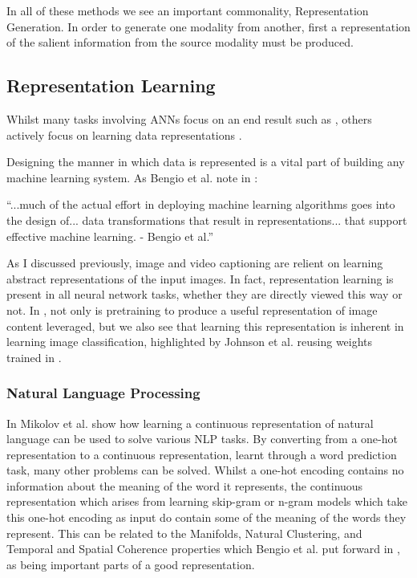 In all of these methods we see an important commonality, Representation Generation. In order to generate one modality from another, first a representation of the salient information from the source modality must be produced.

\subsection{Representation Learning}

Whilst many tasks involving \acp{ANN} focus on an end result such as \cite{krizhevsky2012imagenet}, others actively focus on learning data representations \cite{radford2015unsupervised, silberer2014learning, wavenet, vincent2010stacked, mikolov2013distributed, mikolov2013efficient, mikolov2013linguistic, feng2010visual, eslami2018neural, donahue2019large}.

Designing the manner in which data is represented is a vital part of building any machine learning system. As Bengio et al. note in \cite{repRev}:

\begin{displayquote}
``...much of the actual effort in deploying machine learning algorithms goes into the design of... data transformations that result in representations... that support effective machine learning. - Bengio et al.''
\end{displayquote}

As I discussed previously, image and video captioning are relient on learning abstract representations of the input images. In fact, representation learning is present in all neural network tasks, whether they are directly viewed this way or not. In \cite{vinyals2015show, venugopalan2014translating, johnson2016densecap}, not only is pretraining to produce a useful representation of image content leveraged, but we also see that learning this representation is inherent in learning image classification, highlighted by Johnson et al. \cite{johnson2016densecap} reusing weights trained in \cite{simonyan2014very}. 

\subsubsection{Natural Language Processing}
In \cite{mikolov2013distributed, mikolov2013efficient, mikolov2013linguistic} Mikolov et al. show how learning a continuous representation of natural language can be used to solve various \ac{NLP} tasks. By converting from a one-hot representation to a continuous representation, learnt through a word prediction task, many other problems can be solved. 
Whilst a one-hot encoding contains no information about the meaning of the word it represents, the continuous representation which arises from learning skip-gram or n-gram models which take this one-hot encoding as input do contain some of the meaning of the words they represent. This can be related to the Manifolds, Natural Clustering, and Temporal and Spatial Coherence properties which Bengio et al. put forward in  \cite{repRev}, as being important parts of a good representation.

